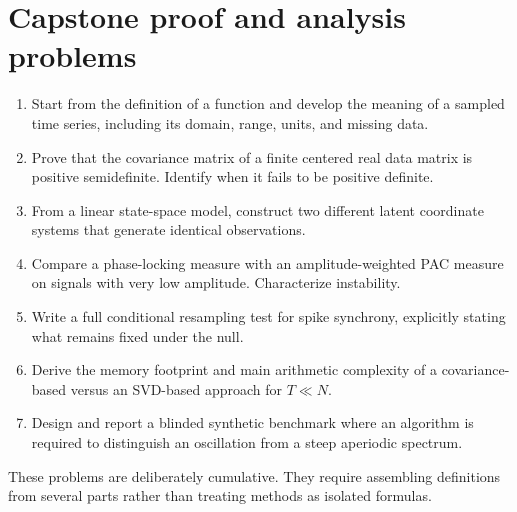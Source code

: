 \section{Capstone proof and analysis problems}
\begin{enumerate}
\item Start from the definition of a function and develop the meaning of a sampled time series, including its domain, range, units, and missing data.
\item Prove that the covariance matrix of a finite centered real data matrix is positive semidefinite. Identify when it fails to be positive definite.
\item From a linear state-space model, construct two different latent coordinate systems that generate identical observations.
\item Compare a phase-locking measure with an amplitude-weighted PAC measure on signals with very low amplitude. Characterize instability.
\item Write a full conditional resampling test for spike synchrony, explicitly stating what remains fixed under the null.
\item Derive the memory footprint and main arithmetic complexity of a covariance-based versus an SVD-based approach for $T\ll N$.
\item Design and report a blinded synthetic benchmark where an algorithm is required to distinguish an oscillation from a steep aperiodic spectrum.
\end{enumerate}
These problems are deliberately cumulative. They require assembling definitions from several parts rather than treating methods as isolated formulas.